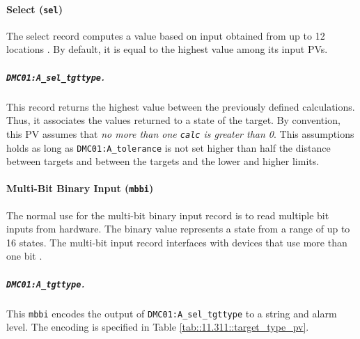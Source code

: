 \paragraph{Select (\texttt{sel})}
    The select record computes a value based on input obtained from up to 12 locations \cite{stanley1998}.
    By default, it is equal to the highest value among its input PVs.

    \subparagraph{\texttt{DMC01:A\_sel\_tgttype}.}
        This record returns the highest value between the previously defined calculations.
        Thus, it associates the values returned to a state of the target.
        By convention, this PV assumes that \emph{no more than one \texttt{calc} is greater than 0}.
        This assumptions holds as long as \texttt{DMC01:A\_tolerance} is not set higher than half the distance between targets and between the targets and the lower and higher limits.

\paragraph{Multi-Bit Binary Input (\texttt{mbbi})}
    The normal use for the multi-bit binary input record is to read multiple bit inputs from hardware.
    The binary value represents a state from a range of up to 16 states.
    The multi-bit input record interfaces with devices that use more than one bit \cite{stanley1998}.

    \subparagraph{\texttt{DMC01:A\_tgttype}.}
        This \texttt{mbbi} encodes the output of \texttt{DMC01:A\_sel\_tgttype} to a string and alarm level.
        The encoding is specified in Table \ref{tab::11.311::target_type_pv}.

